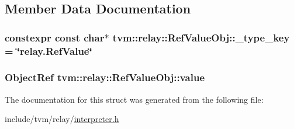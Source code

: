 \subsection{Member Data Documentation}
\subsubsection[{\texorpdfstring{\+\_\+type\+\_\+key}{_type_key}}]{\setlength{\rightskip}{0pt plus 5cm}constexpr const char$\ast$ tvm\+::relay\+::\+Ref\+Value\+Obj\+::\+\_\+type\+\_\+key = \char`\"{}relay.\+Ref\+Value\char`\"{}\hspace{0.3cm}{\ttfamily [static]}}\hypertarget{structtvm_1_1relay_1_1RefValueObj_af24ec90da8c25eb7e400ab432147deae}{}\label{structtvm_1_1relay_1_1RefValueObj_af24ec90da8c25eb7e400ab432147deae}
\subsubsection[{\texorpdfstring{value}{value}}]{\setlength{\rightskip}{0pt plus 5cm}Object\+Ref tvm\+::relay\+::\+Ref\+Value\+Obj\+::value\hspace{0.3cm}{\ttfamily [mutable]}}\hypertarget{structtvm_1_1relay_1_1RefValueObj_a69b5520ce0105cf0fa082f31660d4245}{}\label{structtvm_1_1relay_1_1RefValueObj_a69b5520ce0105cf0fa082f31660d4245}


The documentation for this struct was generated from the following file\+:\begin{DoxyCompactItemize}
\item 
include/tvm/relay/\hyperlink{interpreter_8h}{interpreter.\+h}\end{DoxyCompactItemize}
